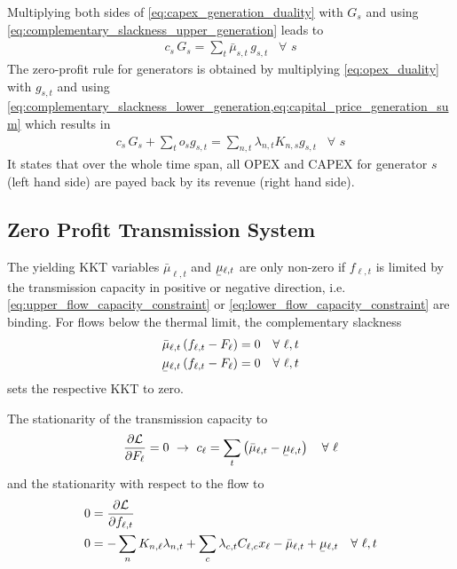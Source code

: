 \documentclass[11pt,twocolumn]{article}
\newcommand{\ubar}[1]{\underaccent{\bar}{#1}}
\newcommand{\Forall}[1]{\hspace{10pt} \forall \,\, #1 }
\newcommand{\pdv}[2]{\frac{\partial #1}{\partial #2}}
\newcommand{\generation}{g_{s,t}}
\newcommand{\capacitygeneration}{G_{s}}
\newcommand{\operationalpricegeneration}{o_{s}}
\newcommand{\capitalpricegeneration}{c_{s}}
\newcommand{\muuppergeneration}{\bar{\mu}_{s,t}}
\newcommand{\flow}{f_{\ell,t}}
\newcommand{\capacityflow}{F_{\ell}}
\newcommand{\capitalpriceflow}{c_{\ell}}
\newcommand{\mulowerflow}{\ubar{\mu}_{\ell,t}}
\newcommand{\muupperflow}{\bar{\mu}_{\ell,t}}
\newcommand{\lagrangian}{\mathcal{L}}
\newcommand{\lmp}[1][n]{\lambda_{#1,t}}
\newcommand{\incidence}[1][n]{K_{#1,\ell}}
\newcommand{\incidencegenerator}[1][n]{K_{#1,s}}
\newcommand{\cycle}{C_{\ell,c}}
\newcommand{\reactance}{x_\ell}
\newcommand{\cycleprice}{\lambda_{c,t}}
\begin{document}
Multiplying both sides of \cref{eq:capex_generation_duality} with $\capacitygeneration$ and using \cref{eq:complementary_slackness_upper_generation} leads to 
\begin{align}
 \capitalpricegeneration \, \capacitygeneration  = \sum_t \muuppergeneration \, \generation \Forall{s} 
 \label{eq:capital_price_generation_sum}
\end{align}
The zero-profit rule for generators is obtained by multiplying \cref{eq:opex_duality} with $\generation$ and using \cref{eq:complementary_slackness_lower_generation,eq:capital_price_generation_sum} which results in 
\begin{align}
  \capitalpricegeneration \, \capacitygeneration + \sum_t \operationalpricegeneration \generation = \sum_{n,t} \lmp \incidencegenerator \generation \Forall{s}
\end{align}
It states that over the whole time span, all OPEX and CAPEX for generator $s$ (left hand side) are payed back by its revenue (right hand side).

\subsection{Zero Profit Transmission System}
\label{sec:zero_profit_flow}

The yielding KKT variables $\muupperflow$ and $\mulowerflow$ are only non-zero if $\flow$ is limited by the transmission capacity in positive or negative direction, i.e. \cref{eq:upper_flow_capacity_constraint} or \cref{eq:lower_flow_capacity_constraint} are binding. For flows below the thermal limit, the complementary slackness 
\begin{align}
\muupperflow \left( \flow - \capacityflow \right)  &= 0 \Forall{\ell,t}
\label{eq:complementary_slackness_upper_flow} \\
\mulowerflow \left( \flow - \capacityflow \right) &=  0 \Forall{\ell,t}
\label{eq:complementary_slackness_lower_flow} 
\end{align}
sets the respective KKT to zero. 

The stationarity of the transmission capacity to
\begin{align}
\pdv{\lagrangian}{\capacityflow} = 0 \,\, \rightarrow \,\, 
\capitalpriceflow =  \sum_t \left( \muupperflow - \mulowerflow \right) \Forall{\ell}
\label{eq:capacity_flow_duality}
\end{align}
and the stationarity with respect to the flow to
\begin{align}
    0 &= \pdv{\lagrangian}{\flow}  \\ 
    0 &= - \sum_n \incidence \lmp  + \sum_c \cycleprice \cycle \reactance  - \muupperflow + \mulowerflow \Forall{\ell, t} \label{eq:flow_duality}
\end{align}
    
\end{document}
